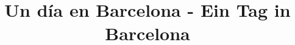 \documentclass[a4paper, pagesize, DIV=15, fontsize=8pt, parskip=half, twoside, BCOR=5mm]{scrartcl}
\begin{document}
\title{Un día en Barcelona - Ein Tag in Barcelona}
\date{}

\maketitle

\newcommand{\rn}[1]{\Rnode{#1}}
\newcommand{\rl}[2]{\ncline[linestyle=solid,arrows=->,nodesepA=0.5pt,linecolor=gray, strokeopacity=0.5]{#1}{#2}}



\begin{paracol}{2}

\end{paracol}
\end{document}
